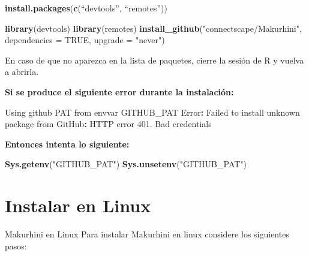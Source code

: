 \documentclass[
]{book}
\newenvironment{Shaded}{\begin{snugshade}}{\end{snugshade}}
\newcommand{\AttributeTok}[1]{\textcolor[rgb]{0.13,0.29,0.53}{#1}}
\newcommand{\ConstantTok}[1]{\textcolor[rgb]{0.56,0.35,0.01}{#1}}
\newcommand{\FloatTok}[1]{\textcolor[rgb]{0.00,0.00,0.81}{#1}}
\newcommand{\FunctionTok}[1]{\textcolor[rgb]{0.13,0.29,0.53}{\textbf{#1}}}
\newcommand{\NormalTok}[1]{#1}
\newcommand{\SpecialCharTok}[1]{\textcolor[rgb]{0.81,0.36,0.00}{\textbf{#1}}}
\newcommand{\StringTok}[1]{\textcolor[rgb]{0.31,0.60,0.02}{#1}}
\begin{document}
\begin{Shaded}
\begin{Highlighting}[]
\FunctionTok{install.packages}\NormalTok{(}\FunctionTok{c}\NormalTok{(“devtools”, “remotes”))}
\end{Highlighting}
\end{Shaded}

\begin{Shaded}
\begin{Highlighting}[]
\FunctionTok{library}\NormalTok{(devtools) }
\FunctionTok{library}\NormalTok{(remotes)}
\FunctionTok{install\_github}\NormalTok{(}\StringTok{"connectscape/Makurhini"}\NormalTok{, }\AttributeTok{dependencies =} \ConstantTok{TRUE}\NormalTok{, }\AttributeTok{upgrade =} \StringTok{"never"}\NormalTok{)}
\end{Highlighting}
\end{Shaded}

En caso de que no aparezca en la lista de paquetes, cierre la sesión de
R y vuelva a abrirla.

\textbf{Si se produce el siguiente error durante la instalación:}

\begin{Shaded}
\begin{Highlighting}[]
\NormalTok{Using github PAT}
\NormalTok{from envvar GITHUB\_PAT Error}\SpecialCharTok{:}\NormalTok{ Failed to install }\StringTok{\textquotesingle{}unknown package\textquotesingle{}}\NormalTok{ from}
\NormalTok{GitHub}\SpecialCharTok{:}\NormalTok{ HTTP error }\FloatTok{401.}\NormalTok{ Bad credentials}
\end{Highlighting}
\end{Shaded}

\textbf{Entonces intenta lo siguiente:}

\begin{Shaded}
\begin{Highlighting}[]
\FunctionTok{Sys.getenv}\NormalTok{(}\StringTok{"GITHUB\_PAT"}\NormalTok{) }
\FunctionTok{Sys.unsetenv}\NormalTok{(}\StringTok{"GITHUB\_PAT"}\NormalTok{)}
\end{Highlighting}
\end{Shaded}

\section{Instalar en Linux}\label{instalar-en-linux}

Makurhini en Linux Para instalar Makurhini en linux considere los
siguientes pasos:
\end{document}
